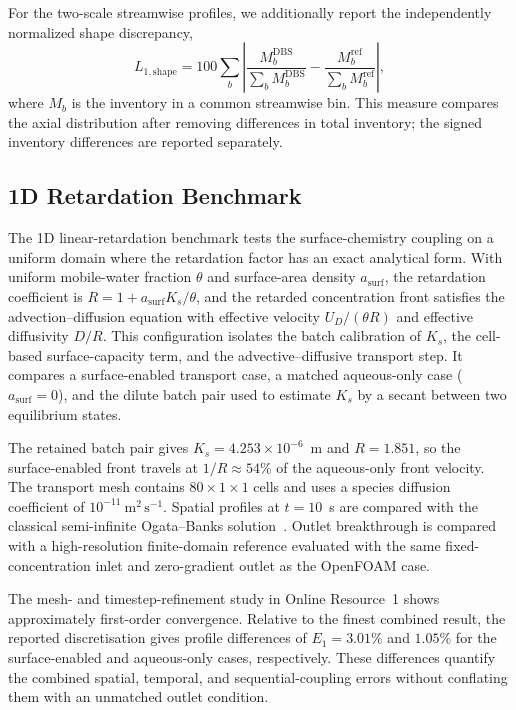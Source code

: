 For the two-scale streamwise profiles, we additionally report the
independently normalized shape discrepancy,
\[
    L_{1,\mathrm{shape}} =
    100\sum_b\left|
    \frac{M_b^{\mathrm{DBS}}}{\sum_b M_b^{\mathrm{DBS}}}
    -
    \frac{M_b^{\mathrm{ref}}}{\sum_b M_b^{\mathrm{ref}}}
    \right|,
\]
where $M_b$ is the inventory in a common streamwise bin. This measure
compares the axial distribution after removing differences in total
inventory; the signed inventory differences are reported separately.

\subsection{1D Retardation Benchmark}\label{sec:1D}

The 1D linear-retardation benchmark tests the surface-chemistry coupling on a
uniform domain where the retardation factor has an exact analytical form.
With uniform mobile-water fraction $\theta$ and surface-area density
$a_{\mathrm{surf}}$, the retardation coefficient is
$R = 1 + a_{\mathrm{surf}} K_s / \theta$, and the retarded concentration front
satisfies the advection--diffusion equation with effective velocity
$U_D/(\theta R)$ and effective diffusivity $D/R$. This configuration isolates
the batch calibration of $K_s$, the cell-based surface-capacity term, and the
advective--diffusive transport step. It compares a surface-enabled transport
case, a matched aqueous-only case ($a_{\mathrm{surf}}=0$), and the dilute batch
pair used to estimate $K_s$ by a secant between two equilibrium states.

The retained batch pair gives $K_s=4.253\times10^{-6}$~m and $R=1.851$, so the
surface-enabled front travels at $1/R\approx54\%$ of the aqueous-only front
velocity. The transport mesh contains $80\times1\times1$ cells and uses a
species diffusion coefficient of $10^{-11}\ \mathrm{m^2\,s^{-1}}$. Spatial
profiles at $t=10$~s are compared with the classical semi-infinite
Ogata--Banks solution~\citep{ogata1961solution}. Outlet breakthrough is
compared with a high-resolution finite-domain reference evaluated with the
same fixed-concentration inlet and zero-gradient outlet as the OpenFOAM case.

The mesh- and timestep-refinement study in Online Resource~1 shows
approximately first-order convergence. Relative to the finest combined result,
the reported discretisation gives profile differences of $E_1=3.01\%$ and
$1.05\%$ for the surface-enabled and aqueous-only cases, respectively. These
differences quantify the combined spatial, temporal, and sequential-coupling
errors without conflating them with an unmatched outlet condition.

